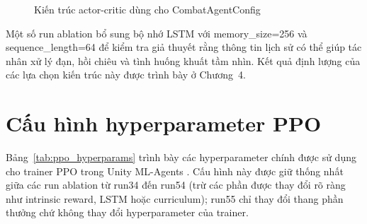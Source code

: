 \begin{figure}[H]
    \centering
    \caption{Kiến trúc actor-critic dùng cho CombatAgentConfig}
    \label{fig:actor_critic_architecture}
\end{figure}

Một số run ablation bổ sung bộ nhớ LSTM với memory\_size=256 và sequence\_length=64 để kiểm tra giả thuyết rằng thông tin lịch sử có thể giúp tác nhân xử lý đạn, hồi chiêu và tình huống khuất tầm nhìn. Kết quả định lượng của các lựa chọn kiến trúc này được trình bày ở Chương~4.

\section{Cấu hình hyperparameter PPO}

Bảng~\ref{tab:ppo_hyperparams} trình bày các hyperparameter chính được sử dụng cho trainer PPO trong Unity ML-Agents \cite{Juliani2018}. Cấu hình này được giữ thống nhất giữa các run ablation từ run34 đến run54 (trừ các phần được thay đổi rõ ràng như intrinsic reward, LSTM hoặc curriculum); run55 chỉ thay đổi thang phần thưởng chứ không thay đổi hyperparameter của trainer.

